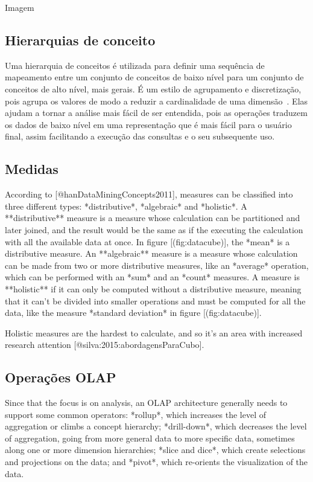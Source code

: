 {\color{red} Imagem}

\subsection{Hierarquias de conceito}
\label{ch:fun:cube:concept}

Uma hierarquia de conceitos é utilizada para definir uma sequência de mapeamento entre um conjunto de conceitos de baixo nível para um conjunto de conceitos de alto nível, mais gerais.
É um estilo de agrupamento e discretização, pois agrupa os valores de modo a reduzir a cardinalidade de uma dimensão~\cite{hanDataMiningConcepts2011}.
Elas ajudam a tornar a análise mais fácil de ser entendida, pois as operações traduzem os dados de baixo nível em uma representação que é mais fácil para o usuário final, assim facilitando a execução das consultas e o seu subsequente uso.

\subsection{Medidas}

According to [@hanDataMiningConcepts2011], measures can be classified into three different types: *distributive*, *algebraic* and *holistic*. A **distributive** measure is a measure whose calculation can be partitioned and later joined, and the result would be the same as if the executing the calculation with all the available data at once. In figure [\@ref(fig:datacube)], the *mean* is a distributive measure.
An **algebraic** measure is a measure whose calculation can be made from two or more distributive measures, like an *average* operation, which can be performed with an *sum* and an *count* measures.
A measure is **holistic** if it can only be computed without a distributive measure, meaning that it can't be divided into smaller operations and must be computed for all the data, like the measure *standard deviation* in figure [\@ref(fig:datacube)].

Holistic measures are the hardest to calculate, and so it's an area with increased research attention [@silva:2015:abordagensParaCubo].

\subsection{Operações OLAP}
\label{ch:fun:olap:ops}

Since that the focus is on analysis, an OLAP architecture generally needs to support some common operators: *rollup*, which increases the level of aggregation or climbs a concept hierarchy; *drill-down*, which decreases the level of aggregation, going from more general data to more specific data, sometimes along one or more dimension hierarchies; *slice and dice*, which create selections and projections on the data; and *pivot*, which re-orients the visualization of the data.

